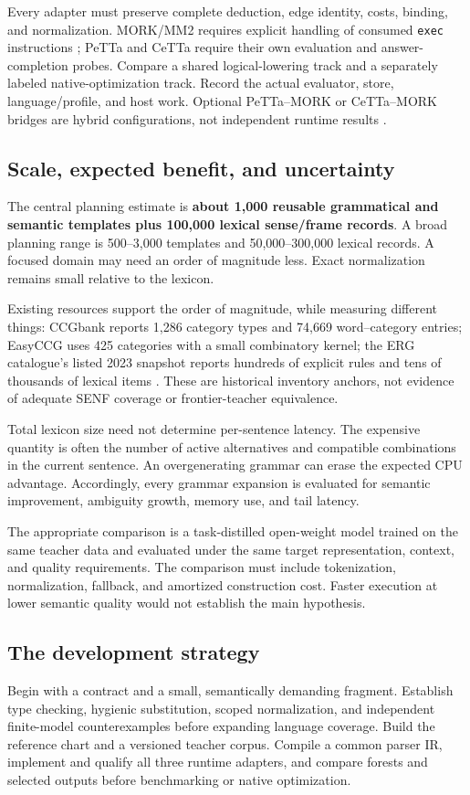 \documentclass[11pt,a4paper]{article}
\newcommand{\code}[1]{\texttt{#1}}
\begin{document}
Every adapter must preserve complete deduction, edge identity, costs,
binding, and normalization. MORK/MM2 requires explicit handling of consumed
\code{exec} instructions \cite{morkmm2}; PeTTa and CeTTa require their own
evaluation and answer-completion probes. Compare a shared logical-lowering
track and a separately labeled native-optimization track. Record the actual
evaluator, store, language/profile, and host work. Optional PeTTa--MORK or
CeTTa--MORK bridges are hybrid configurations, not independent runtime
results \cite{petta,cetta}.

\subsection*{Scale, expected benefit, and uncertainty}
The central planning estimate is \textbf{about 1,000 reusable grammatical and
semantic templates plus 100,000 lexical sense/frame records}. A broad planning
range is 500--3,000 templates and 50,000--300,000 lexical records. A focused
domain may need an order of magnitude less. Exact normalization remains small
relative to the lexicon.

Existing resources support the order of magnitude, while measuring different
things: CCGbank reports 1,286 category types and 74,669 word--category entries;
EasyCCG uses 425 categories with a small combinatory kernel; the ERG
catalogue's listed 2023 snapshot reports hundreds of explicit rules and tens
of thousands of lexical items \cite{ccgbank,easyccg,ergcatalogue}. These are
historical inventory anchors, not evidence of adequate SENF coverage or
frontier-teacher equivalence.

Total lexicon size need not determine per-sentence latency. The expensive
quantity is often the number of active alternatives and compatible
combinations in the current sentence. An overgenerating grammar can erase
the expected CPU advantage. Accordingly, every grammar expansion is evaluated
for semantic improvement, ambiguity growth, memory use, and tail latency.

The appropriate comparison is a task-distilled open-weight model trained on
the same teacher data and evaluated under the same target representation,
context, and quality requirements. The comparison must include tokenization,
normalization, fallback, and amortized construction cost. Faster execution at
lower semantic quality would not establish the main hypothesis.

\subsection*{The development strategy}
Begin with a contract and a small, semantically demanding fragment. Establish
type checking, hygienic substitution, scoped normalization, and independent
finite-model counterexamples before expanding language coverage. Build the
reference chart and a versioned teacher corpus. Compile a common parser
IR, implement and qualify all three runtime adapters, and compare forests
and selected outputs before benchmarking or native optimization.
\end{document}
